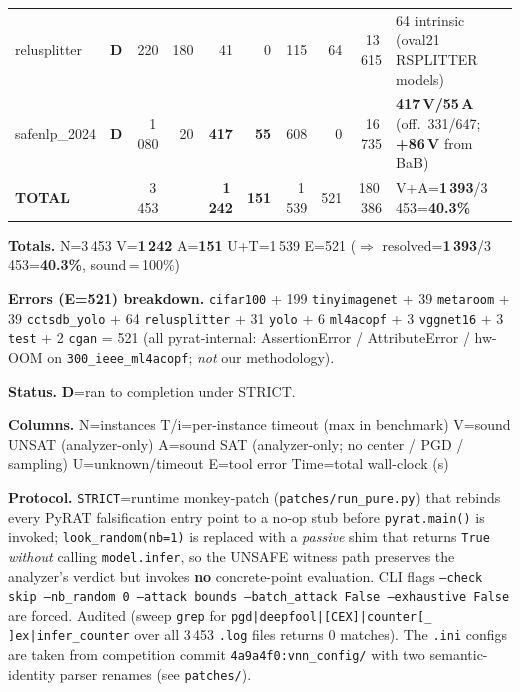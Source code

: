 \documentclass[10pt]{beamer}
\newcommand{\sdone}{{\color{cdone}\textbf{D}}}
\begin{document}
\begin{frame}[fragile]
\begin{tabular}{l c r r r r r r r l}
relusplitter                      & \sdone & 220   & 180     & 41           & 0           & 115   & 64  & 13\,615 & 64 intrinsic (oval21 RSPLITTER models) \\
safenlp\_2024                     & \sdone & 1\,080 & 20      & \textbf{417} & \textbf{55} & 608   & 0   & 16\,735 & \textbf{417\,V/55\,A} (off.\ 331/647; \textbf{+86\,V} from BaB) \\
\midrule
\textbf{TOTAL}                    &        & 3\,453 &        & \textbf{1\,242} & \textbf{151} & 1\,539 & 521 & 180\,386 & V+A=\textbf{1\,393}/3\,453=\textbf{40.3\%} \\
\bottomrule
\end{tabular}

\vspace{0.4em}
\centering\scriptsize
\textbf{Totals.}\quad
N=3\,453\quad
V=\textbf{1\,242}\quad
A=\textbf{151}\quad
U+T=1\,539\quad
E=521\quad
($\Rightarrow$ resolved=\textbf{1\,393}/3\,453=\textbf{40.3\%},
sound\,=\,100\%)

\vspace{0.2em}
\centering\scriptsize
\textbf{Errors (E=521) breakdown.} \texttt{cifar100} + 199 \texttt{tinyimagenet} + 39 \texttt{metaroom} +
39 \texttt{cctsdb\_yolo} + 64 \texttt{relusplitter} + 31 \texttt{yolo} +
6 \texttt{ml4acopf} + 3 \texttt{vggnet16} + 3 \texttt{test} + 2 \texttt{cgan} =
521 (all pyrat-internal: AssertionError / AttributeError / hw-OOM on
\texttt{300\_ieee\_ml4acopf}; \emph{not} our methodology).

\vspace{0.3em}
\centering\scriptsize
\textbf{Status.}\;
\sdone{}=ran to completion under STRICT.

\textbf{Columns.}\;
N=instances\quad
T/i=per-instance timeout (max in benchmark)\quad
V=sound UNSAT (analyzer-only)\quad
A=sound SAT (analyzer-only; no center / PGD / sampling)\quad
U=unknown/timeout\quad
E=tool error\quad
Time=total wall-clock (s)

\vspace{0.2em}
\centering\scriptsize
\textbf{Protocol.}\;
\texttt{STRICT}=runtime monkey-patch (\texttt{patches/run\_pure.py}) that rebinds
every PyRAT falsification entry point to a no-op stub before \texttt{pyrat.main()} is
invoked; \texttt{look\_random(nb=1)} is replaced with a \emph{passive} shim that
returns \texttt{True} \emph{without} calling \texttt{model.infer}, so the UNSAFE
witness path preserves the analyzer's verdict but invokes \textbf{no} concrete-point
evaluation. CLI flags \texttt{--check skip --nb\_random 0 --attack bounds
--batch\_attack False --exhaustive False} are forced. Audited (sweep
\texttt{grep} for \texttt{pgd|deepfool|[CEX]|counter[\_ ]ex|infer\_counter}
over all 3\,453 \texttt{.log} files returns 0 matches). The \texttt{.ini}
configs are taken from competition commit \texttt{4a9a4f0:vnn\_config/} with
two semantic-identity parser renames (see \texttt{patches/}).

\end{frame}
\end{document}
